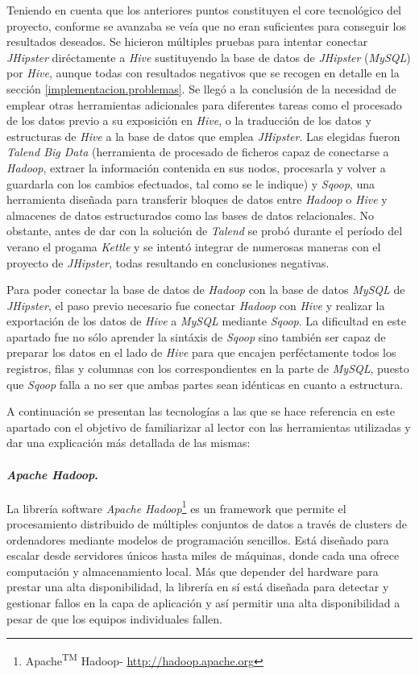 	\par
	Teniendo en cuenta que los anteriores puntos constituyen el core tecnológico del proyecto, conforme se avanzaba se veía que no eran suficientes para conseguir los resultados deseados. Se hicieron múltiples pruebas para intentar conectar \textit{JHipster} diréctamente a \textit{Hive} sustituyendo la base de datos de \textit{JHipster} (\textit{MySQL}) por \textit{Hive}, aunque todas con resultados negativos que se recogen en detalle en la sección \ref{implementacion.problemas}. Se llegó a la conclusión de la necesidad de emplear otras herramientas adicionales para diferentes tareas como el procesado de los datos previo a su exposición en \textit{Hive}, o la traducción de los datos y estructuras de \textit{Hive} a la base de datos que emplea \textit{JHipster}. Las elegidas fueron \textit{Talend Big Data} (herramienta de procesado de ficheros capaz de conectarse a \textit{Hadoop},  extraer la información contenida en sus nodos, procesarla y volver a guardarla con los cambios efectuados, tal como se le indique) y \textit{Sqoop}, una herramienta diseñada para transferir bloques de datos entre \textit{Hadoop} o \textit{Hive} y almacenes de datos estructurados como las bases de datos relacionales. No obstante, antes de dar con la solución de \textit{Talend} se probó durante el período del verano el progama \textit{Kettle} y se intentó integrar de numerosas maneras con el proyecto de \textit{JHipster}, todas resultando en conclusiones negativas.
	\par	
	Para poder conectar la base de datos de \textit{Hadoop} con la base de datos \textit{MySQL} de \textit{JHipster}, el paso previo necesario fue conectar \textit{Hadoop} con \textit{Hive} y realizar la exportación de los datos de \textit{Hive} a \textit{MySQL} mediante \textit{Sqoop}. La dificultad en este apartado fue no sólo aprender la sintáxis de \textit{Sqoop} sino también ser capaz de preparar los datos en el lado de \textit{Hive} para que encajen perféctamente todos los registros, filas y columnas con los correspondientes en la parte de \textit{MySQL}, puesto que \textit{Sqoop} falla a no ser que ambas partes sean idénticas en cuanto a estructura. \par
	A continuación se presentan las tecnologías a las que se hace referencia en este apartado con el objetivo de familiarizar al lector con las herramientas utilizadas y dar una explicación más detallada de las mismas:
\paragraph*{\textit{Apache Hadoop}.} La librería software \textit{Apache Hadoop}\footnote{Apache\textsuperscript{TM} Hadoop\textregistered - \url{http://hadoop.apache.org}} es un framework que permite el procesamiento distribuido de múltiples conjuntos de datos a través de clusters de ordenadores mediante modelos de programación sencillos. Está diseñado para escalar desde servidores únicos hasta miles de máquinas, donde cada una ofrece computación y almacenamiento local. Más que depender del hardware para prestar una alta disponibilidad, la librería en sí está diseñada para detectar y gestionar fallos en la capa de aplicación y así permitir una alta disponibilidad a pesar de que los equipos individuales fallen. 
